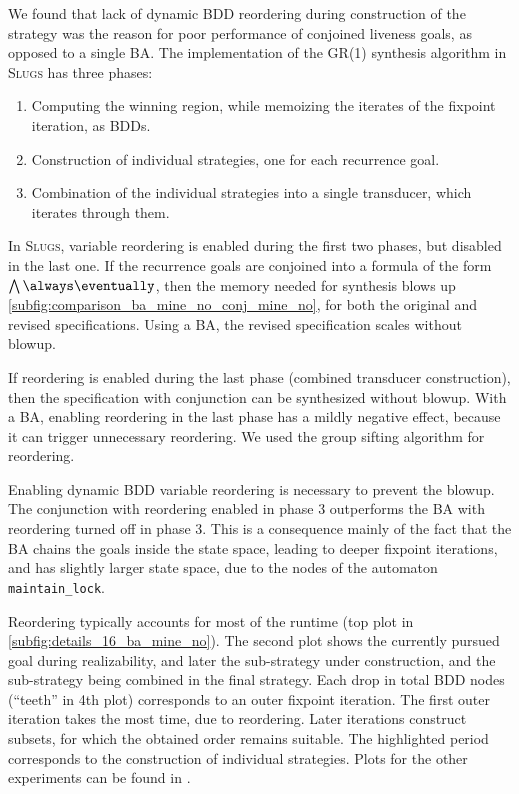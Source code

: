 \documentclass[copyright]{eptcs}
\begin{document}
We found that lack of dynamic BDD reordering during construction of the strategy was the reason for poor performance of conjoined liveness goals, as opposed to a single BA.
The implementation of the GR(1) synthesis algorithm in \textsc{Slugs} has three phases:
\begin{enumerate}
	\item Computing the winning region, while memoizing the iterates of the fixpoint iteration, as BDDs.
	\item Construction of individual strategies, one for each recurrence goal.
	\item Combination of the individual strategies into a single transducer, which iterates through them.
\end{enumerate}
In \textsc{Slugs}, variable reordering \cite{Rudell1993iccad} is enabled during the first two phases, but disabled in the last one.
If the recurrence goals are conjoined into a formula of the form $\bigwedge \always \eventually$, then the memory needed for synthesis blows up \cref{subfig:comparison_ba_mine_no_conj_mine_no}, for both the original and revised specifications.
Using a BA, the revised specification scales without blowup.

If reordering is enabled during the last phase (combined transducer construction), then the specification with conjunction can be synthesized without blowup.
With a BA, enabling reordering in the last phase has a mildly negative effect, because it can trigger unnecessary reordering.
We used the group sifting algorithm \cite{Panda95iccad,Rudell1993iccad} for reordering.

Enabling dynamic BDD variable reordering  is necessary to prevent the blowup.
The conjunction with reordering enabled in phase 3 outperforms the BA with reordering turned off in phase 3.
This is a consequence mainly of the fact that the BA chains the goals inside the state space, leading to deeper fixpoint iterations, and has slightly larger state space, due to the nodes of the automaton \texttt{maintain\_lock}.

Reordering typically accounts for most of the runtime (top plot in \cref{subfig:details_16_ba_mine_no}).
The second plot shows the currently pursued goal during realizability, and later the sub-strategy under construction, and the sub-strategy being combined in the final strategy.
Each drop in total BDD nodes (“teeth” in 4th plot) corresponds to an outer fixpoint iteration.
The first outer iteration takes the most time, due to reordering.
Later iterations construct subsets, for which the obtained order remains suitable.
The highlighted period corresponds to the construction of individual strategies.
Plots for the other experiments can be found in \cite{Filippidis15cds4-amba}.
\end{document}
